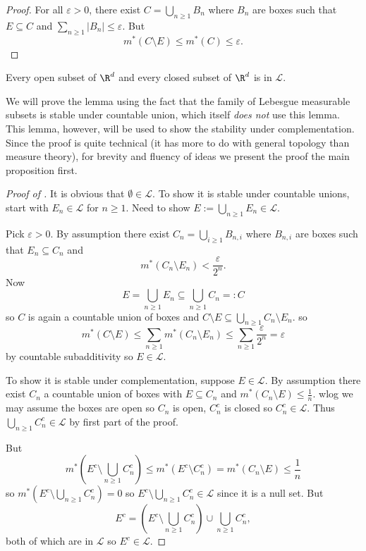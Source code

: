 \documentclass[a4paper]{article}
\begin{document}
\begin{proof}
  For all \(\varepsilon > 0\), there exist \(C = \bigcup_{n \geq 1} B_n\) where \(B_n\) are boxes such that \(E \subseteq C\) and \(\sum_{n \geq 1} |B_n| \leq \varepsilon\). But
  \[
    m^*(C \setminus E) \leq m^*(C) \leq \varepsilon.
  \]
\end{proof}

\begin{lemma}
  \label{lem:open and closed sets are Lebesgue measurable}
  Every open subset of \(\R^d\) and every closed subset of \(\R^d\) is in \(\mathcal L\).
\end{lemma}

We will prove the lemma using the fact that the family of Lebesgue measurable subsets is stable under countable union, which itself \emph{does not} use this lemma. This lemma, however, will be used to show the stability under complementation. Since the proof is quite technical (it has more to do with general topology than measure theory), for brevity and fluency of ideas we present the proof the main proposition first.

\begin{proof}[Proof of ]
  It is obvious that \(\emptyset \in \mathcal L\). To show it is stable under countable unions, start with \(E_n \in \mathcal L\) for \(n \geq 1\). Need to show \(E := \bigcup_{n \geq 1} E_n \in \mathcal L\).

  Pick \(\varepsilon > 0\). By assumption there exist \(C_n = \bigcup_{i \geq 1} B_{n, i}\) where \(B_{n, i}\) are boxes such that \(E_n \subseteq C_n\) and
  \[
    m^*(C_n \setminus E_n) < \frac{\varepsilon}{2^n}.
  \]
  Now
  \[
    E = \bigcup_{n \geq 1} E_n \subseteq \bigcup_{n \geq 1} C_n =: C
  \]
  so \(C\) is again a countable union of boxes and \(C \setminus E \subseteq \bigcup_{n \geq 1} C_n \setminus E_n\).
  so
  \[
    m^*(C \setminus E) \leq \sum_{n \geq 1} m^*(C_n \setminus E_n) \leq \sum_{n \geq 1} \frac{\varepsilon}{2^n} = \varepsilon
  \]
  by countable subadditivity so \(E \in \mathcal L\).

  To show it is stable under complementation, suppose \(E \in \mathcal L\). By assumption there exist \(C_n\) a countable union of boxes with \(E \subseteq C_n\) and \(m^*(C_n \setminus E) \leq \frac{1}{n}\). wlog we may assume the boxes are open so \(C_n\) is open, \(C_n^c\) is closed so \(C_n^c \in \mathcal L\). Thus \(\bigcup_{n \geq 1} C_n^c \in \mathcal L\) by first part of the proof.

  But
  \[
    m^*(E^c \setminus \bigcup_{n \geq 1} C_n^c)
    \leq m^*(E^c \setminus C_n^c)
    = m^*(C_n \setminus E)
    \leq \frac{1}{n}
  \]
  so \(m^*(E^c \setminus \bigcup_{n \geq 1} C_n^c) = 0\) so \(E^c \setminus \bigcup_{n \geq 1} C_n^c \in \mathcal L\) since it is a null set. But
  \[
    E^c = (E^c \setminus \bigcup_{n \geq 1} C_n^c) \cup \bigcup_{n \geq 1} C_n^c,
  \]
  both of which are in \(\mathcal L\) so \(E^c \in \mathcal L\).
\end{proof}
\end{document}
